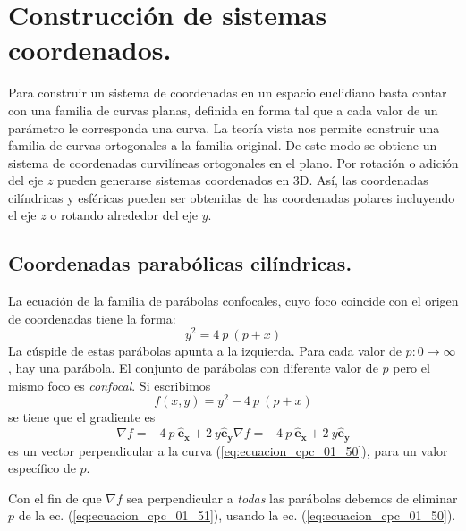 \section{Construcción de sistemas coordenados.}
Para construir un sistema de coordenadas en un espacio euclidiano basta contar con una familia de curvas planas, definida en forma tal que a cada valor de un parámetro le corresponda una curva. La teoría vista nos permite construir una familia de curvas ortogonales a la familia original. De este modo se obtiene un sistema de coordenadas curvilíneas ortogonales en el plano. Por rotación o adición del eje $z$ pueden generarse sistemas coordenados en 3D. Así, las coordenadas cilíndricas y esféricas pueden ser obtenidas de las coordenadas polares incluyendo el eje $z$ o rotando alrededor del eje $y$.
\subsection*{Coordenadas parabólicas cilíndricas.}
La ecuación de la familia de parábolas confocales, cuyo foco coincide con el origen de coordenadas tiene la forma:
\begin{equation}
y^{2} = 4 \: p \: (p + x)
\label{eq:ecuacion_cpc_01_50}
\end{equation}
La cúspide de estas parábolas apunta a la izquierda. Para cada valor de $p: 0 \to \infty$, hay una parábola. El conjunto de parábolas con diferente valor de $p$ pero el mismo foco es \emph{confocal}. Si escribimos
\[ f(x,y) = y^{2} - 4 \: p \: (p + x) \]
se tiene que el gradiente es
\begin{equation}
\nabla f = - 4 \: p \: \mathbf{\widehat{e}_{x}} + 2 \: y  \mathbf{\widehat{e}_{y}}
\nabla f = - 4 \: p \: \mathbf{\widehat{e}_{x}} + 2 \: y  \mathbf{\widehat{e}_{y}}
\label{eq:ecuacion_cpc_01_51}
\end{equation}
es un vector perpendicular a la curva (\ref{eq:ecuacion_cpc_01_50}), para un valor específico de $p$.
\par
Con el fin de que $\nabla f$ sea perpendicular a \emph{todas} las parábolas debemos de eliminar $p$ de la ec. (\ref{eq:ecuacion_cpc_01_51}), usando la ec. (\ref{eq:ecuacion_cpc_01_50}). 

